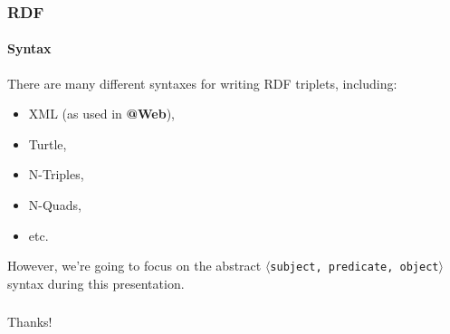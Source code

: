 \documentclass{beamer}
\makeatletter
\newcommand{\atweb}{\textbf{@Web}\xspace}
\newcommand{\triplet}[1]{$\langle$\texttt{#1}$\rangle$}
\makeatother
\begin{document}
\begin{frame}
  \frametitle{RDF}
  \framesubtitle{Syntax}

  There are many different syntaxes for writing RDF triplets, including:

  \pause

  \begin{itemize}
    \item XML (as used in \atweb),

    \pause

    \item Turtle,
    \item N-Triples,
    \item N-Quads,
    \item etc.
  \end{itemize}

  \pause

  However, we're going to focus on the abstract \triplet{subject, predicate,
  object} syntax during this presentation.
\end{frame}

\begin{frame}
  \frametitle{}
\end{frame}

\begin{frame}
  \frametitle{}
\end{frame}

\begin{frame}
  \frametitle{}
\end{frame}

\begin{frame}
  \frametitle{}
\end{frame}

\begin{frame}
  \frametitle{}
\end{frame}

\begin{frame}
  \begin{center}
    \Huge{Thanks!}
  \end{center}
\end{frame}
\end{document}
